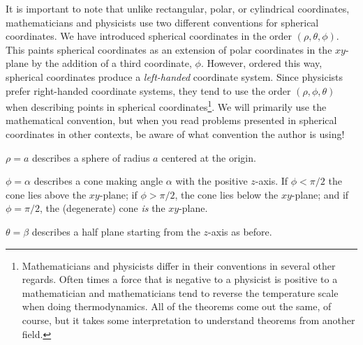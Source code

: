 It is important to note that unlike rectangular, polar, or cylindrical coordinates,
mathematicians and physicists use two different conventions for spherical coordinates.
We have introduced spherical coordinates in the order $(\rho,\theta,\phi)$.  This
paints spherical coordinates as an extension of polar coordinates in the $xy$-plane by
the addition of a third coordinate, $\phi$.  However, ordered this way, spherical
coordinates produce a \emph{left-handed} coordinate system.  Since physicists prefer
right-handed coordinate systems, they tend to use the order $(\rho,\phi,\theta)$ when
describing points in spherical coordinates\footnote{ Mathematicians and physicists
differ in their conventions in several other regards.  Often times a force that is negative
to a physicist is positive to a mathematician and mathematicians tend to reverse the temperature
scale when doing thermodynamics.  All of the theorems come out the same, of course,
but it takes some interpretation to understand theorems from another field.}.  
We will primarily use the mathematical convention,
but when you read problems presented in spherical coordinates in other contexts, be
aware of what convention the author is using!


\begin{example}
$\rho = a$ describes a sphere of radius $a$ centered at the origin.
\end{example}

\begin{example}
$\phi = \alpha$ describes a cone making angle $\alpha$ with the
positive $z$-axis.  If $\phi<\pi/2$ the cone lies above the $xy$-plane;
	if $\phi>\pi/2$, the cone lies below the $xy$-plane; 
	and if $\phi=\pi/2$, the (degenerate) cone \emph{is} the $xy$-plane.
\end{example}

\begin{example}
$\theta = \beta$ describes a half plane starting from the $z$-axis
as before.
\end{example}

